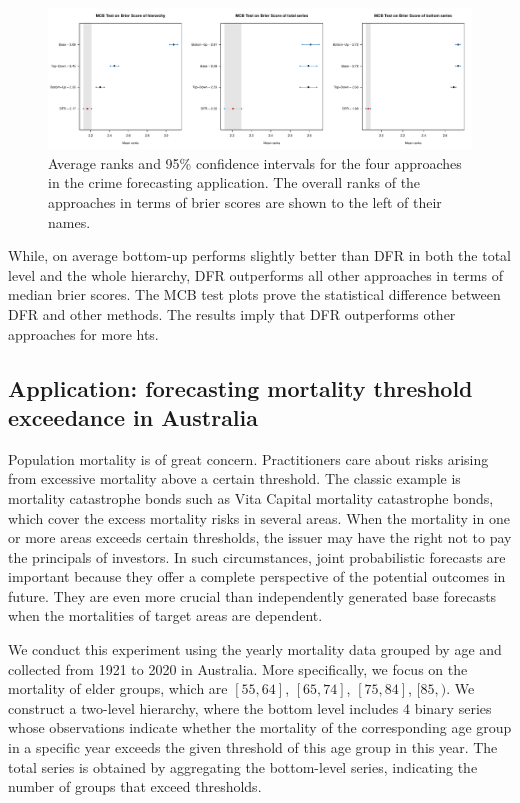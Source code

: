 \documentclass[a4paper,review,12pt,authoryear]{elsarticle}
\begin{document}
     \begin{figure}[h]
       \caption{\label{fig:application_crime}Average ranks and 95\% confidence intervals for the four approaches in the crime forecasting application. The overall ranks of the approaches in terms of brier scores are shown to the left of their names.}
       \centering
       \includegraphics[width=\textwidth]{figures/dc_crime_bs.pdf}
     \end{figure}
     
     While, on average bottom-up performs slightly better than DFR in both the total level and the whole hierarchy, DFR outperforms all other approaches in terms of median brier scores.
     The MCB test plots prove the statistical difference between DFR and other methods. 
     The results imply that DFR outperforms other approaches for more hts.
     
     \subsection{Application: forecasting mortality threshold exceedance in Australia}
     \label{sec:application_mortality}
     Population mortality is of great concern. 
     Practitioners care about risks arising from excessive mortality above a certain threshold. 
     The classic example is mortality catastrophe bonds such as Vita Capital mortality catastrophe bonds, which cover the excess mortality risks in several areas.
     When the mortality in one or more areas exceeds certain thresholds, the issuer may have the right not to pay the principals of investors.
     In such circumstances, joint probabilistic forecasts are important because they offer a complete perspective of the potential outcomes in future.
     They are even more crucial than independently generated base forecasts when the mortalities of target areas are dependent.
     
     We conduct this experiment using the yearly mortality data grouped by age and collected from 1921 to 2020 in Australia.
     More specifically, we focus on the mortality of elder groups, which are $[55, 64]$, $[65, 74]$, $[75, 84]$, $[85, )$. 
     We construct a two-level hierarchy, where the bottom level includes 
     $4$ binary series whose observations indicate whether the mortality of the corresponding age group in a specific year exceeds the given threshold of this age group in this year.
     The total series is obtained by aggregating the bottom-level series, indicating the number of groups that exceed thresholds.
     
\end{document}
